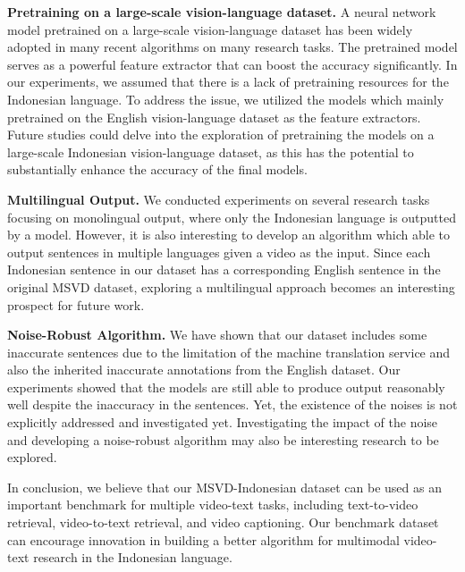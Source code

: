 \documentclass{article}
\begin{document}
\textbf{Pretraining on a large-scale vision-language dataset.} A neural network model pretrained on a large-scale vision-language dataset has been widely adopted in many recent algorithms on many research tasks. The pretrained model serves as a powerful feature extractor that can boost the accuracy significantly. In our experiments, we assumed that there is a lack of pretraining resources for the Indonesian language. To address the issue, we utilized the models which mainly pretrained on the English vision-language dataset as the feature extractors. Future studies could delve into the exploration of pretraining the models on a large-scale Indonesian vision-language dataset, as this has the potential to substantially enhance the accuracy of the final models.

\textbf{Multilingual Output.} We conducted experiments on several research tasks focusing on monolingual output, where only the Indonesian language is outputted by a model. However, it is also interesting to develop an algorithm which able to output sentences in multiple languages given a video as the input. Since each Indonesian sentence in our dataset has a corresponding English sentence in the original MSVD dataset, exploring a multilingual approach becomes an interesting prospect for future work.

\textbf{Noise-Robust Algorithm.} We have shown that our dataset includes some inaccurate sentences due to the limitation of the machine translation service and also the inherited inaccurate annotations from the English dataset. Our experiments showed that the models are still able to produce output reasonably well despite the inaccuracy in the sentences. Yet, the existence of the noises is not explicitly addressed and investigated yet.  Investigating the impact of the noise and developing a noise-robust algorithm may also be interesting research to be explored.

In conclusion, we believe that our MSVD-Indonesian dataset can be used as an important benchmark for multiple video-text tasks, including text-to-video retrieval, video-to-text retrieval, and video captioning. Our benchmark dataset can encourage innovation in building a better algorithm for multimodal video-text research in the Indonesian language.
\end{document}
